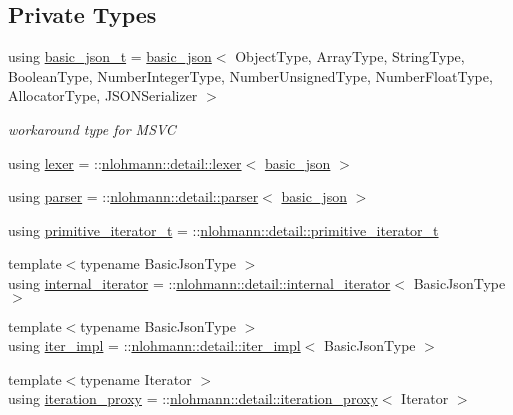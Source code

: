 \subsection*{Private Types}
\begin{DoxyCompactItemize}
\item 
using \hyperlink{classnlohmann_1_1basic__json_afc4033f5af721feb287b0676723a145f}{basic\+\_\+json\+\_\+t} = \hyperlink{classnlohmann_1_1basic__json}{basic\+\_\+json}$<$ Object\+Type, Array\+Type, String\+Type, Boolean\+Type, Number\+Integer\+Type, Number\+Unsigned\+Type, Number\+Float\+Type, Allocator\+Type, J\+S\+O\+N\+Serializer $>$
\begin{DoxyCompactList}\small\item\em workaround type for M\+S\+VC \end{DoxyCompactList}\item 
using \hyperlink{classnlohmann_1_1basic__json_a163540181fa07868de2902ecdb6df2ae}{lexer} = \+::\hyperlink{classnlohmann_1_1detail_1_1lexer}{nlohmann\+::detail\+::lexer}$<$ \hyperlink{classnlohmann_1_1basic__json}{basic\+\_\+json} $>$
\item 
using \hyperlink{classnlohmann_1_1basic__json_aba9704e82d18f8954f9925e26cec7a51}{parser} = \+::\hyperlink{classnlohmann_1_1detail_1_1parser}{nlohmann\+::detail\+::parser}$<$ \hyperlink{classnlohmann_1_1basic__json}{basic\+\_\+json} $>$
\item 
using \hyperlink{classnlohmann_1_1basic__json_a2b38de408edf89649e8bd3abcfdff038}{primitive\+\_\+iterator\+\_\+t} = \+::\hyperlink{classnlohmann_1_1detail_1_1primitive__iterator__t}{nlohmann\+::detail\+::primitive\+\_\+iterator\+\_\+t}
\item 
{\footnotesize template$<$typename Basic\+Json\+Type $>$ }\\using \hyperlink{classnlohmann_1_1basic__json_a3ce72c6254981a9d378ece3c9b15e96b}{internal\+\_\+iterator} = \+::\hyperlink{structnlohmann_1_1detail_1_1internal__iterator}{nlohmann\+::detail\+::internal\+\_\+iterator}$<$ Basic\+Json\+Type $>$
\item 
{\footnotesize template$<$typename Basic\+Json\+Type $>$ }\\using \hyperlink{classnlohmann_1_1basic__json_abfd677a136936c16adf01e335f6a7a72}{iter\+\_\+impl} = \+::\hyperlink{classnlohmann_1_1detail_1_1iter__impl}{nlohmann\+::detail\+::iter\+\_\+impl}$<$ Basic\+Json\+Type $>$
\item 
{\footnotesize template$<$typename Iterator $>$ }\\using \hyperlink{classnlohmann_1_1basic__json_afb49d897bc58d6678f4471925bbfbb01}{iteration\+\_\+proxy} = \+::\hyperlink{classnlohmann_1_1detail_1_1iteration__proxy}{nlohmann\+::detail\+::iteration\+\_\+proxy}$<$ Iterator $>$

\end{DoxyCompactItemize}
